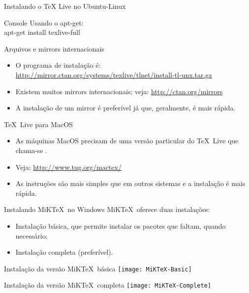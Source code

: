 \begin{frame}{Instalando o \TeX{} Live no Ubuntu-Linux}
\begin{block}{Console}
 Usando o apt-get:\\
 apt-get install texlive-full
\end{block}

\begin{block}{Arquivos e mirrors internacionais}
\begin{itemize}
\item O programa de instalação é:
\url{http://mirror.ctan.org/systems/texlive/tlnet/install-tl-unx.tar.gz}

\item Existem muitos mirrors internacionais; veja:
\url{http://ctan.org/mirrors}

\item A instalação de um mirror é preferível já que, geralmente, é mais rápida.
\end{itemize}
\end{block}
\end{frame}

\begin{frame}{\TeX\ Live para MacOS}
\begin{itemize}
\item As máquinas MacOS precisam de uma versão particular do \TeX~Live que chama-se .
\item Veja: \url{http://www.tug.org/mactex/}
\item As instruções são mais simples que em outros sistemas e a instalação é mais rápida.
\end{itemize}
\end{frame}

\begin{frame}{Instalando MiK\TeX\ no Windows}
MiK\TeX\ oferece duas instalações:
\begin{itemize}
\item Instalação básica, que permite instalar os pacotes que faltam, 
quando necessário;
\item Instalação completa (preferível).
\end{itemize}

\end{frame}

\begin{frame}{Instalação da versão MiK\TeX\ básica}
\centering
\texttt{[image: MiKTeX-Basic]}
\end{frame}

\begin{frame}{Instalação da versão MiK\TeX\ completa}
\centering
\texttt{[image: MiKTeX-Complete]}
\end{frame}
